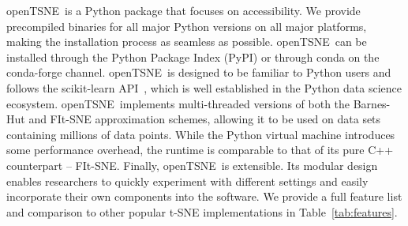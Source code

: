 \documentclass[twocolumn]{bmcart}
\newcommand{\opentsne}{\textsf{openTSNE}}
\begin{document}
\opentsne\ is a Python package that focuses on accessibility. We provide
precompiled binaries for all major Python versions on all major platforms,
making the installation process as seamless as possible. \opentsne\ can be
installed through the Python Package Index (PyPI) or through conda on the
conda-forge channel. \opentsne\ is designed to be familiar to Python users and
follows the \textsf{scikit-learn} API~\cite{sklearn_api}, which is well
established in the Python data science ecosystem. \opentsne\ implements
multi-threaded versions of both the Barnes-Hut and FIt-SNE approximation
schemes, allowing it to be used on data sets containing millions of data
points. While the Python virtual machine introduces some performance overhead,
the runtime is comparable to that of its pure C++ counterpart --
\textsf{FIt-SNE}. Finally, \opentsne\ is extensible. Its modular design enables
researchers to quickly experiment with different settings and easily
incorporate their own components into the software. We provide a full feature
list and comparison to other popular t-SNE implementations in
Table~\ref{tab:features}.
\end{document}
